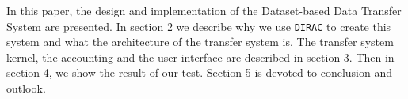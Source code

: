 In this paper, the design and implementation of 
the Dataset-based Data Transfer System are presented.
In section 2 we describe why we use {\tt DIRAC} to create this system
and what the architecture of the transfer system is.
The transfer system kernel, the accounting and the user interface
are described in section 3.
Then in section 4, we show the result of our test.
Section 5 is devoted to conclusion and outlook.

